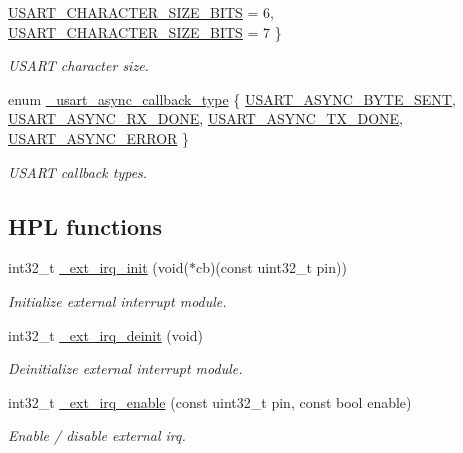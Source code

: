 \begin{DoxyCompactItemize}
\hyperlink{group___h_p_l_gga631ce7b4f60dccd392e6d6ef7d3cd4e2ad8f2a75feeac704acc0b9af6947e4734}{U\+S\+A\+R\+T\+\_\+\+C\+H\+A\+R\+A\+C\+T\+E\+R\+\_\+\+S\+I\+Z\+E\+\_\+B\+I\+TS} = 6, 
\newline
\hyperlink{group___h_p_l_gga631ce7b4f60dccd392e6d6ef7d3cd4e2a9fe87d41d9dd672038c67eaea63d6d96}{U\+S\+A\+R\+T\+\_\+\+C\+H\+A\+R\+A\+C\+T\+E\+R\+\_\+\+S\+I\+Z\+E\+\_\+B\+I\+TS} = 7
 \}\begin{DoxyCompactList}\small\item\em U\+S\+A\+RT character size. \end{DoxyCompactList}
\item 
enum \hyperlink{group___h_p_l_gace00dc77ac02c91f8bf35551b484927c}{\+\_\+usart\+\_\+async\+\_\+callback\+\_\+type} \{ \hyperlink{group___h_p_l_ggace00dc77ac02c91f8bf35551b484927ca5cbff5ce7030edf0c23f4e2291839142}{U\+S\+A\+R\+T\+\_\+\+A\+S\+Y\+N\+C\+\_\+\+B\+Y\+T\+E\+\_\+\+S\+E\+NT}, 
\hyperlink{group___h_p_l_ggace00dc77ac02c91f8bf35551b484927cad2ef0bf5b401a3c576c17cab2a6df7bf}{U\+S\+A\+R\+T\+\_\+\+A\+S\+Y\+N\+C\+\_\+\+R\+X\+\_\+\+D\+O\+NE}, 
\hyperlink{group___h_p_l_ggace00dc77ac02c91f8bf35551b484927ca8a94d01c89c71f1bf2a1b68edadbfbfa}{U\+S\+A\+R\+T\+\_\+\+A\+S\+Y\+N\+C\+\_\+\+T\+X\+\_\+\+D\+O\+NE}, 
\hyperlink{group___h_p_l_ggace00dc77ac02c91f8bf35551b484927cac9790dc229a5fa436d2ef48e8ac1024c}{U\+S\+A\+R\+T\+\_\+\+A\+S\+Y\+N\+C\+\_\+\+E\+R\+R\+OR}
 \}\begin{DoxyCompactList}\small\item\em U\+S\+A\+RT callback types. \end{DoxyCompactList}
\end{DoxyCompactItemize}
\subsection*{H\+PL functions}
\begin{DoxyCompactItemize}
\item 
int32\+\_\+t \hyperlink{group___h_p_l_gad7c12a758c9839e074d1d97d255e09ab}{\+\_\+ext\+\_\+irq\+\_\+init} (void($\ast$cb)(const uint32\+\_\+t pin))
\begin{DoxyCompactList}\small\item\em Initialize external interrupt module. \end{DoxyCompactList}\item 
int32\+\_\+t \hyperlink{group___h_p_l_gad29f685cb658b260303c55fb7a88cdb0}{\+\_\+ext\+\_\+irq\+\_\+deinit} (void)
\begin{DoxyCompactList}\small\item\em Deinitialize external interrupt module. \end{DoxyCompactList}\item 
int32\+\_\+t \hyperlink{group___h_p_l_gac2fa4b43da6356425b0188b744b6f4cc}{\+\_\+ext\+\_\+irq\+\_\+enable} (const uint32\+\_\+t pin, const bool enable)
\begin{DoxyCompactList}\small\item\em Enable / disable external irq. \end{DoxyCompactList}\end{DoxyCompactItemize}
